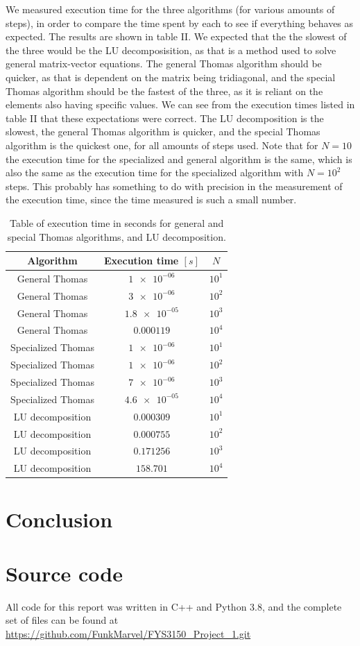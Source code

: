 \documentclass[english,notitlepage,reprint]{revtex4-1}  %
\begin{document}
We measured execution time for the three algorithms (for various amounts of steps), in order to compare the time spent by each to see if everything behaves as expected. The results are shown in table II. We expected that the the slowest of the three would be the LU decomposisition, as that is a method used to solve general matrix-vector equations. The general Thomas algorithm should be quicker, as that is dependent on the matrix being tridiagonal, and the special Thomas algorithm should be the fastest of the three, as it is reliant on the elements also having specific values. We can see from the execution times listed in table II that these expectations were correct. The LU decomposition is the slowest, the general Thomas algorithm is quicker, and the special Thomas algorithm is the quickest one, for all amounts of steps used. Note that for $N=10$ the execution time for the specialized and general algorithm is the same, which is also the same as the execution time for the specialized algorithm with $N=10^2$ steps. This probably has something to do with precision in the measurement of the execution time, since the time measured is such a small number.


\begin{table}[H]
	\centering
	\label{table:iv:c:1}
	\caption{Table of execution time in seconds for general and special Thomas algorithms, and LU decomposition.}
		
	\begin{tabular}{|c|c|c|}
		\hline
		Algorithm & Execution time \([s]\) & \(N\) \\\hline
		General Thomas & \(\num{1e-06}\) & \(10^{1}\) \\
		General Thomas & \(\num{3e-06}\) & \(10^{2}\) \\
		General Thomas & \(\num{1.8e-05}\) & \(10^{3}\) \\
		General Thomas & \(\num{0.000119}\) & \(10^{4}\) \\\hline
		Specialized Thomas & \(\num{1e-06}\) & \(10^{1}\) \\
		Specialized Thomas & \(\num{1e-06}\) & \(10^{2}\) \\
		Specialized Thomas & \(\num{7e-06}\) & \(10^{3}\) \\
		Specialized Thomas & \(\num{4.6e-05}\) & \(10^{4}\) \\\hline
		LU decomposition & \(\num{0.000309}\) & \(10^{1}\) \\
		LU decomposition & \(\num{0.000755}\) & \(10^{2}\) \\
		LU decomposition & \(\num{0.171256}\) & \(10^{3}\) \\
		LU decomposition & \(\num{158.701}\) & \(10^{4}\) \\\hline
	\end{tabular}
	
\end{table}

\section{Conclusion} \label{sec:V}

{}

\appendix
\section{Source code}
All code for this report was written in C++ and Python 3.8, and the complete set of files can be found at \url{https://github.com/FunkMarvel/FYS3150_Project_1.git}
\end{document}
